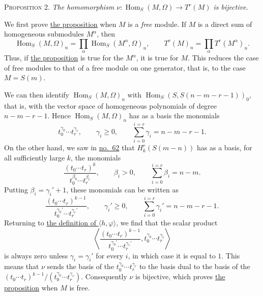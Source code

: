 \label{fac:III:4:no:71:prop:2}
\textsc{Proposition 2.} \textit{The homomorphism
$\nu:\operatorname{Hom}_S(M,\Omega)\longrightarrow T^r(M)$ is
bijective.}

\label{fac:III:4:no:71:proof:free-case}
We first prove \hyperref[fac:III:4:no:71:prop:2]{the proposition} when $M$
is a \textit{free} module. If
$M$ is a direct sum of homogeneous submodules $M^\alpha$, then
\label{fac:III:4:no:71:formula:direct-products}
\[
\operatorname{Hom}_S(M,\Omega)_n
=\prod_\alpha\operatorname{Hom}_S(M^\alpha,\Omega)_n,
\qquad
T^r(M)_n=\prod_\alpha T^r(M^\alpha)_n.
\]
Thus, if \hyperref[fac:III:4:no:71:prop:2]{the proposition} is true for the
$M^\alpha$, it is true for
$M$. This reduces the case of free modules to that of a free module on
one generator, that is, to the case $M=S(m)$.

We can then identify $\operatorname{Hom}_S(M,\Omega)_n$ with
$\operatorname{Hom}_S(S,S(n-m-r-1))_0$, that is, with the vector space
of homogeneous polynomials of degree $n-m-r-1$. Hence
$\operatorname{Hom}_S(M,\Omega)_n$ has as a basis the monomials
\label{fac:III:4:no:71:formula:polynomial-basis}
\[
t_0^{\gamma_0}\cdots t_r^{\gamma_r},
\qquad
\gamma_i\geq0,
\qquad
\sum_{i=0}^{i=r}\gamma_i=n-m-r-1.
\]
On the other hand, we saw in \hyperref[fac:III:3:no:62]{no.~62} that
$H_k^r(S(m-n))$ has as a
basis, for all sufficiently large $k$, the monomials
\[
\frac{(t_0\cdots t_r)^k}
     {t_0^{\beta_0}\cdots t_r^{\beta_r}},
\qquad
\beta_i>0,
\qquad
\sum_{i=0}^{i=r}\beta_i=n-m.
\]
Putting $\beta_i=\gamma_i'+1$, these monomials can be written as
\label{fac:III:4:no:71:formula:cohomology-basis}
\[
\frac{(t_0\cdots t_r)^{k-1}}
     {t_0^{\gamma_0'}\cdots t_r^{\gamma_r'}},
\qquad
\gamma_i'\geq0,
\qquad
\sum_{i=0}^{i=r}\gamma_i'=n-m-r-1.
\]
Returning to
\hyperref[fac:III:4:no:71:formula:pairing]{the definition of
$\langle h,\varphi\rangle$}, we find
that the scalar product
\label{fac:III:4:no:71:formula:dual-basis-pairing}
\[
\left\langle
 \frac{(t_0\cdots t_r)^{k-1}}
      {t_0^{\gamma_0'}\cdots t_r^{\gamma_r'}},
 t_0^{\gamma_0}\cdots t_r^{\gamma_r}
\right\rangle
\]
is always zero unless $\gamma_i=\gamma_i'$ for every $i$, in which
case it is equal to $1$. This means that $\nu$ sends the basis of the
$t_0^{\gamma_0}\cdots t_r^{\gamma_r}$ to the basis dual to the basis
of the
$(t_0\cdots t_r)^{k-1}/(t_0^{\gamma_0}\cdots t_r^{\gamma_r})$.
Consequently $\nu$ is bijective, which proves
\hyperref[fac:III:4:no:71:prop:2]{the proposition} when $M$ is free.

